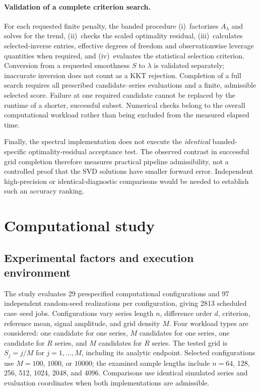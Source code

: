 \paragraph{Validation of a complete criterion search.}
For each requested finite penalty, the banded procedure
(i)~factorizes $A_\lambda$ and solves for the trend,
(ii)~checks the scaled optimality residual,
(iii)~calculates selected-inverse entries, effective
degrees of freedom and observationwise leverage quantities
when required, and (iv)~evaluates the statistical selection
criterion. Conversion from a requested smoothness $S$ to
$\lambda$ is validated separately; inaccurate inversion
does not count as a KKT rejection. Completion of a full
search requires all prescribed candidate--series evaluations
and a finite, admissible selected score. Failure at one
required candidate cannot be replaced by the runtime of
a shorter, successful subset. Numerical checks belong to
the overall computational workload rather than being
excluded from the measured elapsed time.

Finally, the spectral implementation does not execute
the \emph{identical} banded-specific optimality-residual
acceptance test. The observed contrast in successful
grid completion therefore measures practical pipeline
admissibility, not a controlled proof that the SVD
solutions have smaller forward error. Independent
high-precision or identical-diagnostic comparisons
would be needed to establish such an accuracy ranking.

\section{Computational study}
\subsection{Experimental factors and execution environment}
The study evaluates 29 prespecified computational configurations and 97 independent random-seed realizations per configuration, giving 2813 scheduled case--seed jobs. Configurations vary series length $n$, difference order $d$, criterion, reference mean, signal amplitude, and grid density $M$. Four workload types are considered: one candidate for one series, $M$ candidates for one series, one candidate for $R$ series, and $M$ candidates for $R$ series. The tested grid is $S_j=j/M$ for $j=1,\ldots,M$, including its analytic endpoint. Selected configurations use $M=100$, $1000$, or $10000$; the examined sample lengths include $n=64$, 128, 256, 512, 1024, 2048, and 4096. Comparisons use identical simulated series and evaluation coordinates when both implementations are admissible.

